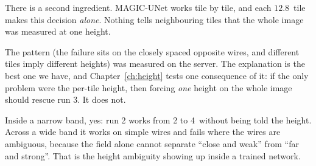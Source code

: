 There is a second ingredient. MAGIC-UNet works tile by tile, and each $12.8$\um\ tile makes this decision \emph{alone}.
Nothing tells neighbouring tiles that the whole image was measured at one height.

\begin{careful}
The pattern (the failure sits on the closely spaced opposite wires, and different tiles imply different heights) was
measured on the server. The explanation is the best one we have, and Chapter~\ref{ch:height} tests one consequence of
it: if the only problem were the per-tile height, then forcing \emph{one} height on the whole image should rescue run 3.
It does not.
\end{careful}

\begin{defend}
Inside a narrow band, yes: run 2 works from 2 to 4\um\ without being told the height. Across a wide band it works on
simple wires and fails where the wires are ambiguous, because the field alone cannot separate ``close and weak'' from
``far and strong''. That is the height ambiguity showing up inside a trained network.
\end{defend}
